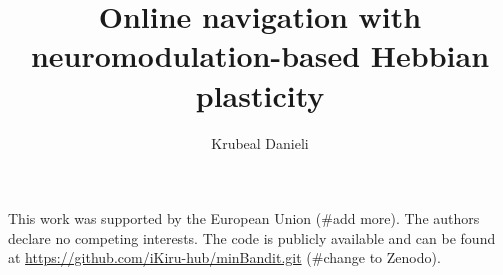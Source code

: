 \documentclass{article}
\begin{document}
\title{Online navigation with neuromodulation-based Hebbian plasticity}
\author{Krubeal Danieli}

\maketitle

\newpage

\tableofcontents

\newpage







\newpage



\newpage



\newpage

This work was supported by the European Union (\#add more).
\hfill \break
The authors declare no competing interests.
\hfill \break
The code is publicly available and can be found at
\url{https://github.com/iKiru-hub/minBandit.git} (\#change to Zenodo).



\newpage


\end{document}
